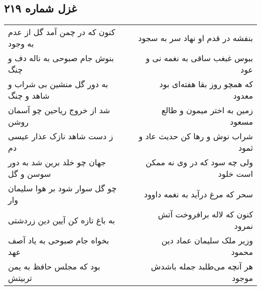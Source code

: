 \begin{center}
\section*{غزل شماره ۲۱۹}
\label{sec:sh219}
\begin{longtable}{l p{0.5cm} r}
کنون که در چمن آمد گل از عدم به وجود
&&
بنفشه در قدم او نهاد سر به سجود
\\
بنوش جام صبوحی به ناله دف و چنگ
&&
ببوس غبغب ساقی به نغمه نی و عود
\\
به دور گل منشین بی شراب و شاهد و چنگ
&&
که همچو روز بقا هفته‌ای بود معدود
\\
شد از خروج ریاحین چو آسمان روشن
&&
زمین به اختر میمون و طالع مسعود
\\
ز دست شاهد نازک عذار عیسی دم
&&
شراب نوش و رها کن حدیث عاد و ثمود
\\
جهان چو خلد برین شد به دور سوسن و گل
&&
ولی چه سود که در وی نه ممکن است خلود
\\
چو گل سوار شود بر هوا سلیمان وار
&&
سحر که مرغ درآید به نغمه داوود
\\
به باغ تازه کن آیین دین زردشتی
&&
کنون که لاله برافروخت آتش نمرود
\\
بخواه جام صبوحی به یاد آصف عهد
&&
وزیر ملک سلیمان عماد دین محمود
\\
بود که مجلس حافظ به یمن تربیتش
&&
هر آنچه می‌طلبد جمله باشدش موجود
\\
\end{longtable}
\end{center}
